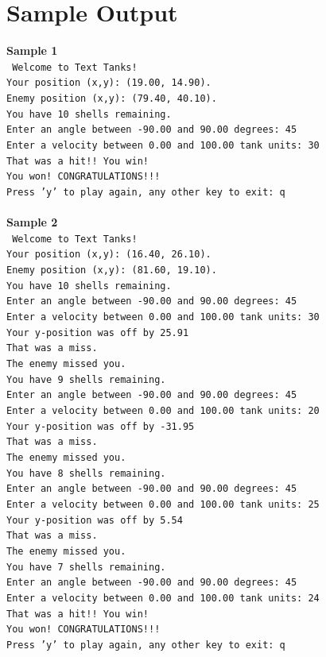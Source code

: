 \documentclass{article}
\begin{document}
\section*{Sample Output}
\textbf{Sample 1}\\
\texttt{
Welcome to Text Tanks!\\
Your position (x,y):  (19.00, 14.90).\\
Enemy position (x,y): (79.40, 40.10).\\
You have 10 shells remaining.\\
Enter an angle between -90.00 and 90.00 degrees: 45\\
Enter a velocity between 0.00 and 100.00 tank units: 30\\
That was a hit!!  You win!\\
You won!  CONGRATULATIONS!!!\\
Press 'y' to play again, any other key to exit: q\\
}\\
\textbf{Sample 2}\\
\texttt{
Welcome to Text Tanks!\\
Your position (x,y):  (16.40, 26.10).\\
Enemy position (x,y): (81.60, 19.10).\\
You have 10 shells remaining.\\
Enter an angle between -90.00 and 90.00 degrees: 45\\
Enter a velocity between 0.00 and 100.00 tank units: 30\\
Your y-position was off by 25.91\\
That was a miss.\\
The enemy missed you.\\
You have 9 shells remaining.\\
Enter an angle between -90.00 and 90.00 degrees: 45\\
Enter a velocity between 0.00 and 100.00 tank units: 20\\
Your y-position was off by -31.95\\
That was a miss.\\
The enemy missed you.\\
You have 8 shells remaining.\\
Enter an angle between -90.00 and 90.00 degrees: 45\\
Enter a velocity between 0.00 and 100.00 tank units: 25\\
Your y-position was off by 5.54\\
That was a miss.\\
The enemy missed you.\\
You have 7 shells remaining.\\
Enter an angle between -90.00 and 90.00 degrees: 45\\
Enter a velocity between 0.00 and 100.00 tank units: 24\\
That was a hit!!  You win!\\
You won!  CONGRATULATIONS!!!\\
Press 'y' to play again, any other key to exit: q\\
}
\end{document}
